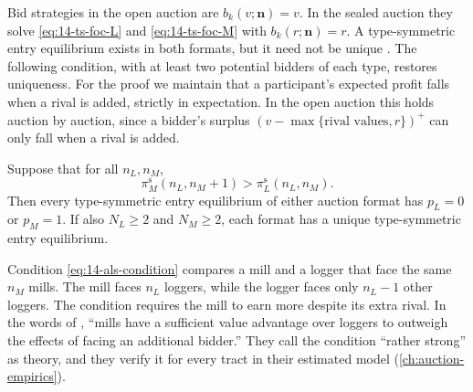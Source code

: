 Bid strategies in the open auction are $b_k(v;\bm n)=v$. In the sealed auction they solve
\eqref{eq:14-ts-foc-L} and \eqref{eq:14-ts-foc-M} with $b_k(r;\bm n)=r$. A type-symmetric entry
equilibrium exists in both formats, but it need not be unique \citep[Section
II.C]{AtheyLevinSeira2011}. The following condition, with at least two potential bidders of each
type, restores uniqueness. For the proof we maintain
that a participant's expected profit falls when a rival is added, strictly in expectation. In the
open auction this holds auction by auction, since a bidder's surplus
$(v-\max\{\text{rival values},r\})^+$ can only fall when a rival is added.

\begin{proposition}\label{prop:14-als-unique}
Suppose that for all $n_L,n_M$,
\begin{equation}\label{eq:14-als-condition}
\pi_M^{\mathrm{s}}(n_L,n_M+1)>\pi_L^{\mathrm{s}}(n_L,n_M).
\end{equation}
Then every type-symmetric entry equilibrium of either auction format has $p_L=0$ or $p_M=1$. If
also $N_L\ge 2$ and $N_M\ge 2$, each format has a unique type-symmetric entry equilibrium.
\end{proposition}

Condition \eqref{eq:14-als-condition} compares a mill and a logger that face the same $n_M$ mills.
The mill faces $n_L$ loggers, while the logger faces only $n_L-1$ other loggers. The condition
requires the mill to earn more despite its extra rival. In the words of \citet[Section
II.C]{AtheyLevinSeira2011}, ``mills have a sufficient value advantage over loggers to outweigh the
effects of facing an additional bidder.'' They call the condition ``rather strong'' as theory, and
they verify it for every tract in their estimated model (\cref{ch:auction-empirics}).

